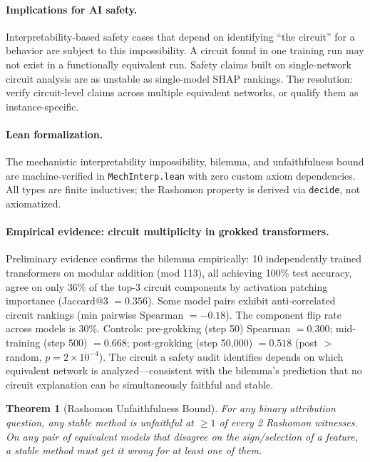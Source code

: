\documentclass{article}
\newtheorem{theorem}{Theorem}
\begin{document}
\paragraph{Implications for AI safety.}
Interpretability-based safety cases that depend on identifying ``the circuit'' for a behavior are subject to this impossibility. A circuit found in one training run may not exist in a functionally equivalent run. Safety claims built on single-network circuit analysis are as unstable as single-model SHAP rankings. The resolution: verify circuit-level claims across multiple equivalent networks, or qualify them as instance-specific.

\paragraph{Lean formalization.}
The mechanistic interpretability impossibility, bilemma, and unfaithfulness bound are machine-verified in \texttt{MechInterp.lean} with zero custom axiom dependencies. All types are finite inductives; the Rashomon property is derived via \texttt{decide}, not axiomatized.

\paragraph{Empirical evidence: circuit multiplicity in grokked transformers.}
Preliminary evidence confirms the bilemma empirically: 10 independently trained transformers on modular addition (mod 113), all achieving 100\% test accuracy, agree on only 36\% of the top-3 circuit components by activation patching importance (Jaccard@3 $= 0.356$). Some model pairs exhibit anti-correlated circuit rankings (min pairwise Spearman $= -0.18$). The component flip rate across models is 30\%. Controls: pre-grokking (step 50) Spearman $= 0.300$; mid-training (step 500) $= 0.668$; post-grokking (step 50{,}000) $= 0.518$ (post $>$ random, $p = 2 \times 10^{-4}$). The circuit a safety audit identifies depends on which equivalent network is analyzed---consistent with the bilemma's prediction that no circuit explanation can be simultaneously faithful and stable.

\begin{theorem}[Rashomon Unfaithfulness Bound]\label{thm:unfaith-bound}
For any binary attribution question, any stable method is unfaithful at $\geq 1$ of every 2 Rashomon witnesses.
On any pair of equivalent models that disagree on the sign/selection of a feature, a stable method must get it wrong for at least one of them.
\end{theorem}
\end{document}
